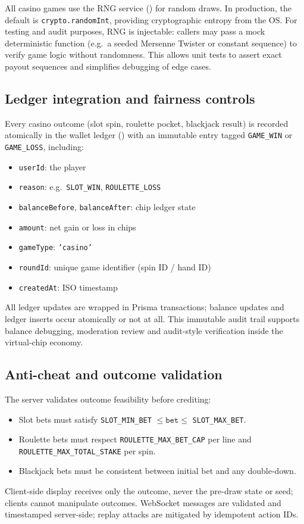 \documentclass[11pt,a4paper]{article}
\begin{document}
All casino games use the RNG service () for random draws. In production, the default is \texttt{crypto.randomInt}, providing cryptographic entropy from the OS. For testing and audit purposes, RNG is injectable: callers may pass a mock deterministic function (e.g.\ a seeded Mersenne Twister or constant sequence) to verify game logic without randomness. This allows unit tests to assert exact payout sequences and simplifies debugging of edge cases.

\subsection{Ledger integration and fairness controls}

Every casino outcome (slot spin, roulette pocket, blackjack result) is recorded atomically in the wallet ledger () with an immutable entry tagged \texttt{GAME\_WIN} or \texttt{GAME\_LOSS}, including:
\begin{itemize}
\item \texttt{userId}: the player
\item \texttt{reason}: e.g.\ \texttt{SLOT\_WIN}, \texttt{ROULETTE\_LOSS}
\item \texttt{balanceBefore}, \texttt{balanceAfter}: chip ledger state
\item \texttt{amount}: net gain or loss in chips
\item \texttt{gameType}: \texttt{'casino'}
\item \texttt{roundId}: unique game identifier (spin ID / hand ID)
\item \texttt{createdAt}: ISO timestamp
\end{itemize}

All ledger updates are wrapped in Prisma transactions; balance updates and ledger inserts occur atomically or not at all. This immutable audit trail supports balance debugging, moderation review and audit-style verification inside the virtual-chip economy.

\subsection{Anti-cheat and outcome validation}

The server validates outcome feasibility before crediting:
\begin{itemize}
\item Slot bets must satisfy \texttt{SLOT\_MIN\_BET} $ \le \texttt{bet} \le$ \texttt{SLOT\_MAX\_BET}.
\item Roulette bets must respect \texttt{ROULETTE\_MAX\_BET\_CAP} per line and \texttt{ROULETTE\_MAX\_TOTAL\_STAKE} per spin.
\item Blackjack bets must be consistent between initial bet and any double-down.
\end{itemize}
Client-side display receives only the outcome, never the pre-draw state or seed; clients cannot manipulate outcomes. WebSocket messages are validated and timestamped server-side; replay attacks are mitigated by idempotent action IDs.
\end{document}

